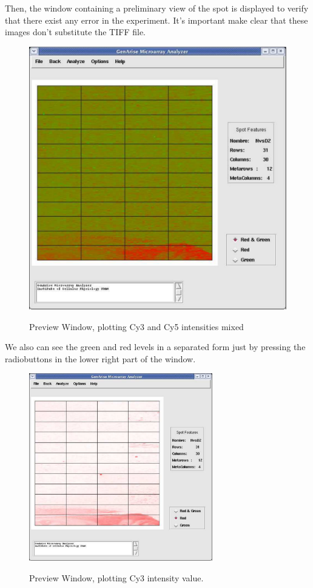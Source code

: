 \documentclass[12pt]{article}
\begin{document}
Then, the window containing a preliminary view of the spot is displayed to verify that there  exist any error in the experiment. It's important make clear that these images don't substitute the TIFF file.

\begin{figure}[h]
\begin{center}
\includegraphics[scale= 0.3]{./images/principal.pdf}\\
\caption{Preview Window, plotting Cy3 and Cy5 intensities mixed\label{fig3}}
\end{center}
\end{figure}
We also can see the green and red levels in a separated form just by pressing the radiobuttons in the lower right part of the window.
\begin{figure}[h]
\begin{center}
\includegraphics[height=3.in,width=3.15in]{./images/principalRed.pdf}\\
\caption{Preview Window, plotting Cy3 intensity value. \label{fig4}}
\end{center}
\end{figure}
\end{document}
